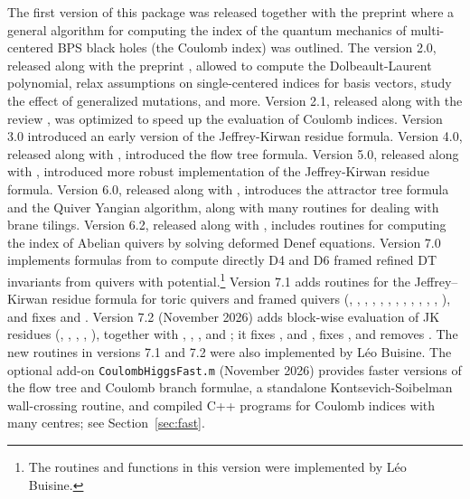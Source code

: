 \documentclass[12pt]{JHEP3}
\newcommand{\fun}[1]{{\color{functioncolor}{\tt #1}}}
\begin{document}
The first version of this package was released together with the preprint \cite{Manschot:2013sya} where a general algorithm for computing the index of the quantum mechanics of multi-centered BPS black holes (the Coulomb index) was outlined. The version 2.0, released along with the preprint \cite{Manschot:2012rx}, allowed to compute the Dolbeault-Laurent polynomial, relax assumptions on single-centered indices for basis vectors, study the effect of generalized mutations, and more. Version 2.1, released along with the review \cite{Manschot:2014fua}, was optimized to speed up the evaluation of Coulomb indices.  Version 3.0 introduced 
an early version of the Jeffrey-Kirwan residue formula. Version 4.0, released along with \cite{Alexandrov:2018iao}, introduced  the flow tree formula. Version 5.0, released along with \cite{Beaujard:2019pkn},
introduced  more robust implementation of the Jeffrey-Kirwan residue formula.
Version 6.0, released along with \cite{BPMozgovoy}, introduces the attractor tree formula and the Quiver Yangian algorithm, along with many routines for dealing with brane tilings. 
Version 6.2, released along with \cite{Beaujard:2021fsk}, includes routines for computing the index of Abelian quivers by solving deformed
Denef equations. Version 7.0 implements formulas from \cite{Descombes:2021snc} to compute directly D4 and D6 framed refined DT invariants from quivers with potential.\footnote{The routines and functions in this version were implemented by Léo Buisine.}
Version 7.1 adds routines for the Jeffrey--Kirwan residue formula for toric quivers and framed quivers (\fun{JKToricInitialize}, \fun{ChargeMatrixFromToricQuiver}, \fun{ZEulerFromQuiver}, \fun{ZRatFromQuiver}, \fun{ZEllipticFromQuiver}, \fun{FlagResidue}, \fun{FramedHeightMatrix}, \fun{FramedJKResidue}, \fun{D6FramedJKResidue}, \fun{D4FramedJKResidue}, \fun{JKResidueFromCrystals}, \fun{JKResidueFromNode}, \fun{JKResidueAtSingularity}), and fixes \fun{FlowTreeFormula} and \fun{FlowTreeFormulaRat}. Version 7.2 (November 2026) adds block-wise evaluation of JK residues (\fun{JKLinearIntegrandData}, \fun{JKStableFlagsFromBlocks}, \fun{JKResidueFromBlocks}, \fun{JKGenericResidueFromBlocks}, \fun{JKEllipticResidueFromBlocks}), together with \fun{ThetaDerivativeAtZero}, \fun{JKPotentialDegree}, \fun{LinearToMultiplicativeWeight}, \fun{SeriesFromInvariants} and \fun{JKInvariantsFromNode}; it fixes \fun{D4FramedNCDTSeries}, \fun{DualFan} and \fun{ExpandTheta}, fixes \fun{ListPerfectMatchings}, and removes \fun{AddAtomToCrystal}. The new routines in versions 7.1 and 7.2 were also implemented by Léo Buisine.
The optional add-on {\tt CoulombHiggsFast.m} (November 2026) provides faster versions of the flow tree and
Coulomb branch formulae, a standalone Kontsevich-Soibelman wall-crossing routine, and compiled C++ programs for
Coulomb indices with many centres; see Section~\ref{sec:fast}.
\end{document}
